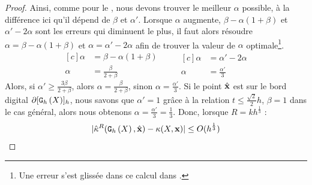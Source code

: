 \begin{proof}
%
Ainsi, comme pour le , nous devons trouver
le meilleur $\alpha$ possible, à la différence ici qu'il dépend de $\beta$ et
$\alpha'$.
%
Lorsque $\alpha$ augmente, $\beta-\alpha(1+\beta)$ et $\alpha'-2\alpha$ sont les
erreurs qui diminuent le plus, il faut alors résoudre $\alpha =
\beta-\alpha(1+\beta)$ et $\alpha = \alpha'-2\alpha$ afin de trouver la valeur
de $\alpha$ optimale\footnote{Une erreur s'est glissée dans ce calcul dans
\cite{DGCI2013}.}.
%
\begin{equation}
\begin{aligned}[c]
  \alpha &= \beta-\alpha(1+\beta)\\
  \alpha &= \frac{\beta}{2+\beta}
\end{aligned}
\qquad
\begin{aligned}[c]
  \alpha &= \alpha' - 2\alpha\\
  \alpha &= \frac{\alpha'}{3}
\end{aligned}
\end{equation}
%
Alors, si $\alpha' \ge \frac{3 \beta}{2 + \beta}$, alors $\alpha = \frac{\beta}{2 +
\beta}$, sinon $\alpha = \frac{\alpha'}{3}$.
%
Si le point $\hat{\mathbf{x}}$ est sur le bord digital $\partial \lbrack \mathtt{G}_{h}\left(X\right) \rbrack_{h}$, nous savons
que $\alpha'=1$ grâce à la relation $t \le \frac{\sqrt{2}}{2}h$, $\beta = 1$
dans le cas général, alors nous obtenons $\alpha = \frac{\alpha'}{3} =
\frac{1}{3}$. Donc, lorsque $R = kh^{\frac{1}{3}}$ :
%
\begin{equation}
  | \hat{\kappa}^{R}(\mathtt{G}_{h}\left(X\right),\hat{\mathbf{x}}) - \kappa(X,\mathbf{x}) | \le O(h^{\frac{1}{3}})
\end{equation}
%
\end{proof}


